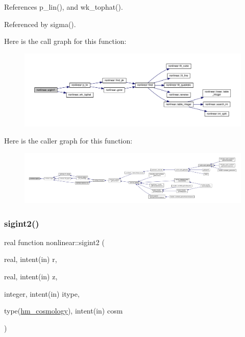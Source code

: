 References p\+\_\+lin(), and wk\+\_\+tophat().



Referenced by sigma().

Here is the call graph for this function\+:
\nopagebreak
\begin{figure}[H]
\begin{center}
\leavevmode
\includegraphics[width=350pt]{namespacenonlinear_ac0dc62ceea1e6ba2e1b7a08a420d934e_cgraph}
\end{center}
\end{figure}
Here is the caller graph for this function\+:
\nopagebreak
\begin{figure}[H]
\begin{center}
\leavevmode
\includegraphics[width=350pt]{namespacenonlinear_ac0dc62ceea1e6ba2e1b7a08a420d934e_icgraph}
\end{center}
\end{figure}
\mbox{\label{namespacenonlinear_a7f3d1c8e1e8b16f59cf8a1d0b6cd5499}} 
\subsubsection{\texorpdfstring{sigint2()}{sigint2()}}
{\footnotesize\ttfamily real function nonlinear\+::sigint2 (\begin{DoxyParamCaption}\item[{real, intent(in)}]{r,  }\item[{real, intent(in)}]{z,  }\item[{integer, intent(in)}]{itype,  }\item[{type(\mbox{\hyperlink{structnonlinear_1_1hm__cosmology}{hm\+\_\+cosmology}}), intent(in)}]{cosm }\end{DoxyParamCaption})\hspace{0.3cm}{\ttfamily [private]}}



